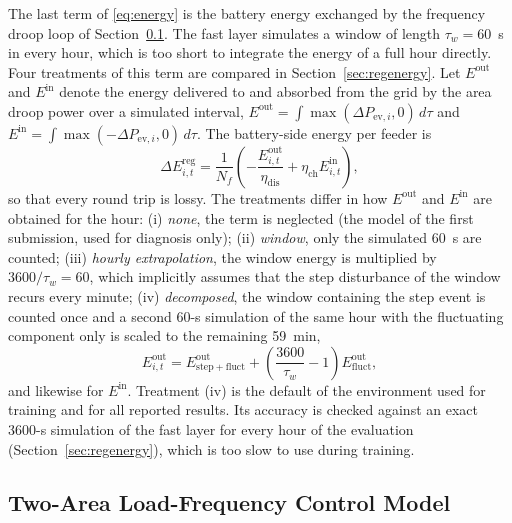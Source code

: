 The last term of \eqref{eq:energy} is the battery energy exchanged by
the frequency droop loop of Section~\ref{sec:lfcmodel}. The fast layer
simulates a window of length $\tau_w=60$~s in every hour, which is
too short to integrate the energy of a full hour directly. Four
treatments of this term are compared in Section~\ref{sec:regenergy}.
Let $E^{\mathrm{out}}$ and $E^{\mathrm{in}}$ denote the energy
delivered to and absorbed from the grid by the area droop power over a
simulated interval, $E^{\mathrm{out}}=\int\max(\Delta P_{\mathrm{ev},i},0)\,d\tau$
and $E^{\mathrm{in}}=\int\max(-\Delta P_{\mathrm{ev},i},0)\,d\tau$. The
battery-side energy per feeder is
\begin{equation}
\Delta E^{\mathrm{reg}}_{i,t}=\frac{1}{N_f}\left(
-\frac{E^{\mathrm{out}}_{i,t}}{\eta_{\mathrm{dis}}}+\eta_{\mathrm{ch}}E^{\mathrm{in}}_{i,t}\right),
\label{eq:regenergy}
\end{equation}
so that every round trip is lossy. The treatments differ in how
$E^{\mathrm{out}}$ and $E^{\mathrm{in}}$ are obtained for the hour:
(i) \emph{none}, the term is neglected (the model of the first
submission, used for diagnosis only); (ii) \emph{window}, only the
simulated 60~s are counted; (iii) \emph{hourly extrapolation}, the
window energy is multiplied by $3600/\tau_w=60$, which implicitly
assumes that the step disturbance of the window recurs every minute;
(iv) \emph{decomposed}, the window containing the step event is counted
once and a second 60-s simulation of the same hour with the
fluctuating component only is scaled to the remaining 59~min,
\begin{equation}
E^{\mathrm{out}}_{i,t}=E^{\mathrm{out}}_{\mathrm{step+fluct}}
+\left(\frac{3600}{\tau_w}-1\right)E^{\mathrm{out}}_{\mathrm{fluct}},
\label{eq:decomposed}
\end{equation}
and likewise for $E^{\mathrm{in}}$. Treatment (iv) is the default of the
environment used for training and for all reported results. Its
accuracy is checked against an exact 3600-s simulation of the fast
layer for every hour of the evaluation (Section~\ref{sec:regenergy}),
which is too slow to use during training.

\subsection{Two-Area Load-Frequency Control Model}
\label{sec:lfcmodel}

